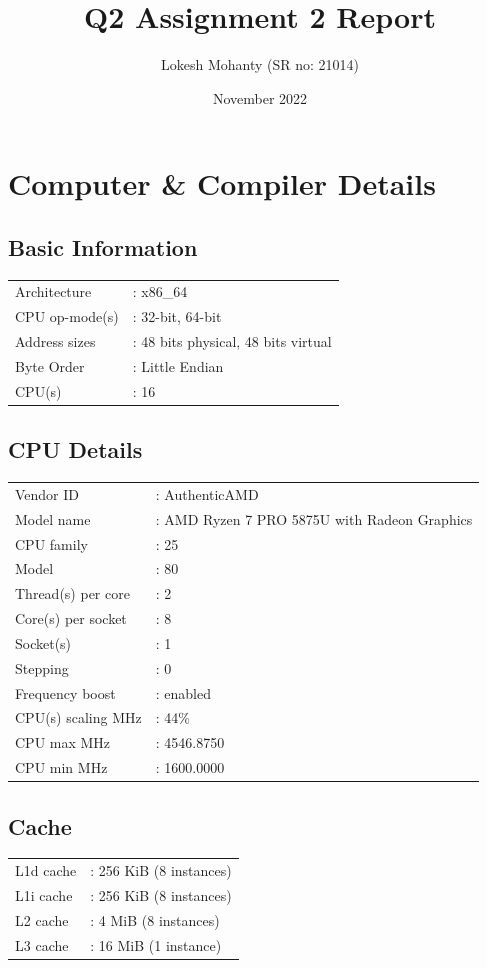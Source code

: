 \documentclass[12pt, letterpaper]{article}
\title{Q2 Assignment 2 Report}
\author{Lokesh Mohanty (SR no: 21014)}
\date{November 2022}
\begin{document}
\maketitle

\section{Computer \& Compiler Details}
\label{sec:comp}

\subsection{Basic Information}
\label{sec:basic}
\begin{tabular}{ll}
  Architecture    &: x86\_64\\
  CPU op-mode(s)  &: 32-bit, 64-bit\\
  Address sizes   &: 48 bits physical, 48 bits virtual\\
  Byte Order      &: Little Endian\\
  CPU(s)          &: 16\\
\end{tabular}

\subsection{CPU Details}
\label{sec:cpu}
\begin{tabular}{ll}
  Vendor ID       &: AuthenticAMD\\
  Model name            &: AMD Ryzen 7 PRO 5875U with Radeon Graphics\\
  CPU family            &: 25\\
  Model                 &: 80\\
  Thread(s) per core    &: 2\\
  Core(s) per socket    &: 8\\
  Socket(s)             &: 1\\
  Stepping              &: 0\\
  Frequency boost       &: enabled\\
  CPU(s) scaling MHz    &: 44\%\\
  CPU max MHz           &: 4546.8750\\
  CPU min MHz           &: 1600.0000\\
\end{tabular}

\subsection{Cache}
\label{sec:cache}
\begin{tabular}{ll}
  L1d cache  &: 256 KiB (8 instances)\\
  L1i cache  &: 256 KiB (8 instances)\\
  L2 cache   &: 4 MiB (8 instances)\\
  L3 cache   &: 16 MiB (1 instance)\\
\end{tabular}
\end{document}
